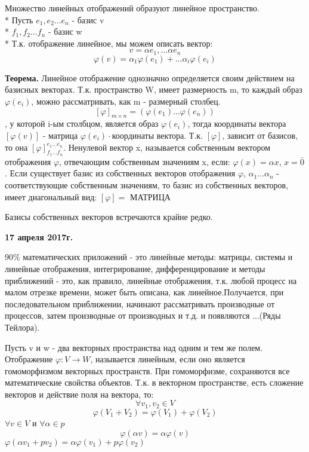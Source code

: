 \documentclass{article}
\begin{document}
Множество линейных отображений образуют линейное пространство.\\*
Пусть $e_1, e_2\ldots e_n$ - базис v\\*
$f_1, f_2\ldots f_n$ - базис w\\*
Т.к. отображение линейное, мы можем описать вектор: $$v=\alpha e_1,\ldots \alpha e_n$$
$$\varphi(v)=\alpha_1\varphi(e_1)+\ldots\alpha_i\varphi(e_i)$$

{\bf Теорема.} Линейное отображение однозначно определяется своим действием на базисных векторах. Т.к. пространство W, имеет размерность m, то каждый образ $\varphi(e_i)$, можно рассматривать, как m - размерный столбец.
$$[\varphi]_{m\times n}=(\varphi(e_1)\ldots\varphi(e_n))$$, у которой i-ым столбцом, является образ $\varphi(e_i)$, тогда координаты вектора $[\varphi(v)]$ - матрица $\varphi(e_i)\cdot$координаты вектора. Т.к. $[\varphi]$, зависит от базисов, то она $[\varphi]_{f_1\ldots f_n}^{e_1\ldots e_n}$. Ненулевой вектор x, называется собственным вектором отображения $\varphi$, отвечающим собственным значениям x, если: $\varphi(x)=\alpha x$, $x=\bar{0}$. Если существует базис из собственных векторов отображения $\varphi$, $\alpha_1\ldots\alpha_n$ - соответствующие собственным значениям, то базис из собственных векторов, имеет диагональный вид: $[\varphi]=$ МАТРИЦА

Базисы собственных векторов встречаются крайне редко.

\textbf {17 апреля 2017г.}

$90\%$ математических приложений - это линейные методы: матрицы, системы и линейные отображения, интегрирование, дифференцирование и методы приближений - это, как правило, линейные отображения, т.к. любой процесс на малом отрезке времени, может быть описана, как линейное.Получается, при последовательном приближении, начинают рассматривать производные от процессов, затем производные от производных и т.д. и появляются ...(Ряды Тейлора).

Пусть v и w - два векторных пространства над одним и тем же полем. Отображение $\varphi:V\to W$, называется линейным, если оно является гомоморфизмом векторных пространств. При гомоморфизме, сохраняются все математические свойства объектов. Т.к. в векторном пространстве, есть сложение векторов и действие поля на вектора, то: $$\forall v_1, v_2 \in V$$
$$\varphi(V_1+V_2)=\varphi(V_1)+\varphi(V_2)$$
$\forall v \in V $ и $ \forall \alpha \in p$\*
$$\varphi(\alpha v)=\alpha\varphi(v)$$
$\varphi(\alpha v_1+pv_2)=\alpha\varphi(v_1)+p\varphi(v_2)$
\end{document}
